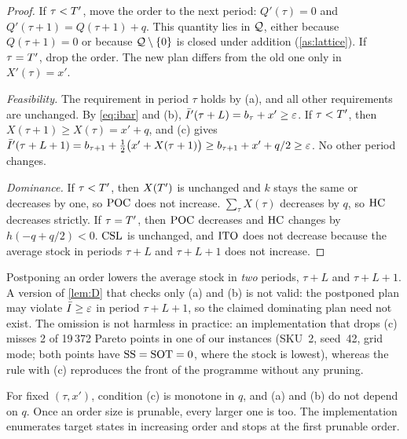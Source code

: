 \begin{proof}
  If $\tau<T'$, move the order to the next period:
  $Q'(\tau)=0$ and $Q'(\tau+1)=Q(\tau+1)+q$. This quantity lies in $\mathcal{Q}$, either because
  $Q(\tau+1)=0$ or because $\mathcal{Q}\setminus\{0\}$ is closed under addition
  (\cref{as:lattice}). If $\tau=T'$, drop the order. The new plan differs from the old
  one only in $X'(\tau)=x'$.

  \emph{Feasibility.} The requirement in period $\tau$ holds by (a), and all other
  requirements are unchanged. By \eqref{eq:ibar} and (b),
  $\bar I'(\tau+L)=b_\tau+x'\ge\varepsilon$. If $\tau<T'$, then $X(\tau+1)\ge X(\tau)=x'+q$, and (c)
  gives $\bar I'(\tau+L+1)=b_{\tau+1}+\tfrac12\bigl(x'+X(\tau+1)\bigr)\ge b_{\tau+1}+x'+q/2\ge\varepsilon$.
  No other period changes.

  \emph{Dominance.} If $\tau<T'$, then $X(T')$ is unchanged and $k$ stays the same or
  decreases by one, so $\mathrm{POC}$ does not increase. $\sum_\tau X(\tau)$ decreases by $q$, so
  $\mathrm{HC}$ decreases strictly. If $\tau=T'$, then $\mathrm{POC}$ decreases and $\mathrm{HC}$ changes by
  $h(-q+q/2)<0$. $\mathrm{CSL}$ is unchanged, and $\mathrm{ITO}$ does not decrease because the average
  stock in periods $\tau+L$ and $\tau+L+1$ does not increase.
\end{proof}

\begin{remark}\label{rem:c}
  Postponing an order lowers the average stock in \emph{two} periods, $\tau+L$ and
  $\tau+L+1$. A version of \cref{lem:D} that checks only (a) and (b) is not valid: the
  postponed plan may violate $\bar I\ge\varepsilon$ in period $\tau+L+1$, so the claimed dominating
  plan need not exist. The omission is not harmless in practice: an
  implementation that drops (c) misses 2 of 19\,372 Pareto points in one of our instances
  (SKU~2, seed~42, grid mode; both points have $\mathrm{SS}=\mathrm{SOT}=0$, where the stock is lowest),
  whereas the rule with (c) reproduces the front of the programme without any pruning.
\end{remark}

\begin{remark}[Implementation]
  For fixed $(\tau,x')$, condition (c) is monotone in $q$, and (a) and (b) do not depend
  on $q$. Once an order size is prunable, every larger one is too. The implementation
  enumerates target states in increasing order and stops at the first prunable order.
\end{remark}

